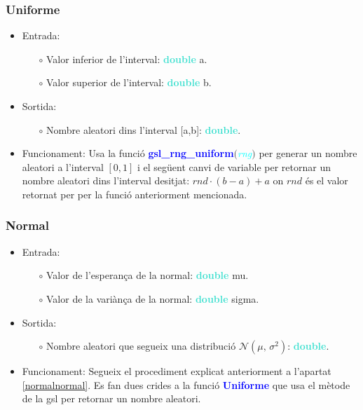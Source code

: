 \documentclass[a4paper, 11pt]{article}
\begin{document}
\subsubsection{Uniforme}
\begin{itemize}
    \item Entrada:
    \begin{itemize}
        \item[$\circ$] Valor inferior de l'interval: \textbf{\textcolor{Turquoise}{double}} a.
        \item[$\circ$] Valor superior de l'interval: \textbf{\textcolor{Turquoise}{double}} b.
    \end{itemize}
    \item Sortida:
        \begin{itemize}
            \item[$\circ$] Nombre aleatori dins l'interval [a,b]:  \textbf{\textcolor{Turquoise}{double}}.
        \end{itemize}
    \item Funcionament:
    Usa la funció \textbf{\textcolor{blue}{gsl\_rng\_uniform}}$($\textcolor{cyan}{\textit{rng}}$)$ per generar un nombre aleatori a l'interval $[0,1]$ i el següent canvi de variable per retornar un nombre aleatori dins l'interval desitjat: $rnd \cdot (b-a) + a $ on $rnd$ és el valor retornat per per la funció anteriorment mencionada.
    
\end{itemize}




\newpage
\subsubsection{Normal}
\begin{itemize}
    \item Entrada:
    \begin{itemize}
        \item[$\circ$] Valor de l'esperança de la normal: \textbf{\textcolor{Turquoise}{double}} mu.
        \item[$\circ$] Valor de la variànça de la normal: \textbf{\textcolor{Turquoise}{double}} sigma.
    \end{itemize}
    \item Sortida:
        \begin{itemize}
            \item[$\circ$] Nombre aleatori que segueix una distribució $\mathcal{N}(\mu,\,\sigma^{2})$:  \textbf{\textcolor{Turquoise}{double}}.
        \end{itemize}
    \item Funcionament:
    Segueix el procediment explicat anteriorment a l'apartat \textcolor{blue}{\ref{normalnormal}}. Es fan dues crides a la funció \textbf{\textcolor{blue}{Uniforme}} que usa el mètode de la gsl per retornar un nombre aleatori.
\end{itemize}
\end{document}
